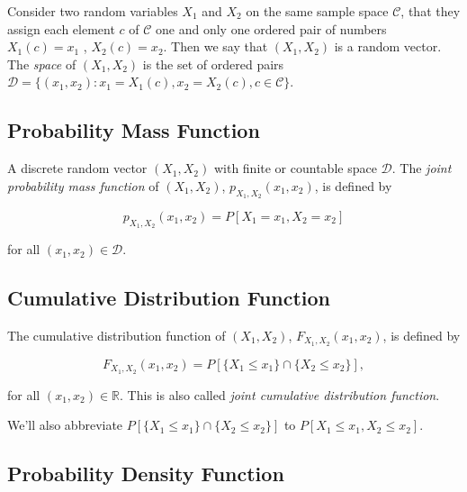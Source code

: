 \documentclass{article}
\begin{document}
        Consider two random variables $ X_{1} $ and $ X_{2} $ on the same
        sample space $ \mathcal{C} $, that they assign each element $ c $ of $
        \mathcal{C} $ one and only one ordered pair of numbers $ X_{1}(c) =
        x_{1} $ , $ X_{2}(c) = x_{2} $. Then we say that $ (X_{1}, X_{2}) $ is
        a random vector. The \textit{space} of $ (X_{1}, X_{2}) $ is the set
        of ordered pairs $ \mathcal{D} =  \{ (x_{1}, x_{2}) : x_{1} = X_{1}(c),
        x_{2} = X_{2}(c), c \in \mathcal{C} \} $.

        \subsection{Probability Mass Function}

            A discrete random vector $ (X_{1}, X_{2}) $ with finite or
            countable space $ \mathcal{D} $. The \textit{joint probability mass
            function} of $ (X_{1}, X_{2})$, $ p_{X_{1}, X_{2}}(x_{1}, x_{2}) $,
            is defined by

            \begin{equation*}
                p_{ X_{1}, X_{2}} (x_{1}, x_{2}) = P [ X_{1} = x_{1}, X_{2} = x_{2} ]
            \end{equation*}

            for all $ (x_{1}, x_{2}) \in \mathcal{D} $.

        \subsection{Cumulative Distribution Function}

            The cumulative distribution function of $ (X_{1}, X_{2}) $, $
            F_{X_{1}, X_{2}} (x_{1}, x_{2}) $, is defined by

            \begin{equation*}
                  F_{X_{1}, X_{2}} (x_{1}, x_{2}) = P [  \{ X_{1} \leq x_{1} \}
                  \cap  \{ X_{2} \leq x_{2} \}],
            \end{equation*}

            for all $ (x_{1}, x_{2}) \in \mathbb{R} $. This is also called
            \textit{joint cumulative distribution function}.

            We'll also abbreviate $
            P [  \{ X_{1} \leq x_{1} \} \cap  \{ X_{2} \leq x_{2} \}] $ to
            $ P [ X_{1} \leq x_{1}, X_{2} \leq x_{2} ] $.

        \subsection{Probability Density Function}
\end{document}
